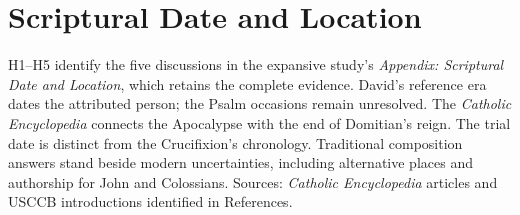 \clearpage
\section{Scriptural Date and Location}


\noindent\footnotesize H1--H5 identify the five discussions in the expansive study's \emph{Appendix: Scriptural Date and Location}, which retains the complete evidence. David's reference era dates the attributed person; the Psalm occasions remain unresolved. The \emph{Catholic Encyclopedia} connects the Apocalypse with the end of Domitian's reign. The trial date is distinct from the Crucifixion's chronology. Traditional composition answers stand beside modern uncertainties, including alternative places and authorship for John and Colossians. Sources: \emph{Catholic Encyclopedia} articles and USCCB introductions identified in References.\par\normalsize
{}
